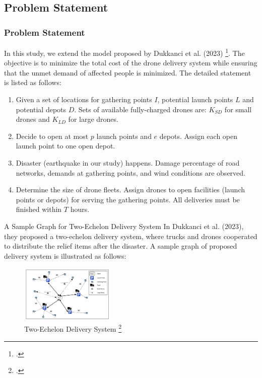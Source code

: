 \documentclass[aspectratio=169]{beamer}
\begin{document}
\subsection{Problem Statement}
\begin{frame}
    \frametitle{Problem Statement}
    In this study, we extend the model proposed by Dukkanci et al. (2023) \footcites{dukkanci2023drones}. The objective is to minimize the total cost of the drone delivery system while ensuring that the unmet demand of affected people is minimized. The detailed statement is listed as follows:
    \begin{enumerate}[label=\arabic*.]
        \item Given a set of locations for gathering points $I$, potential launch points $L$ and potential depots $D$. Sets of available fully-charged drones are: $K_{SD}$ for small drones and $K_{LD}$ for large drones. 
        \item Decide to open at most $p$ launch points and $e$ depots. Assign each open launch point to one open depot.
        \item Disaster (earthquake in our study) happens. Damage percentage of road networks, demands at gathering points, and wind conditions are observed.
        \item Determine the size of drone fleets. Assign drones to open facilities (launch points or depots) for serving the gathering points. All deliveries must be finished within $T$ hours. 
    \end{enumerate}
\end{frame}

\begin{frame}{A Sample Graph for Two-Echelon Delivery System}
    In Dukkanci et al. (2023), they proposed a two-echelon delivery system, where trucks and drones cooperated to distribute the relief items after the disaster. A sample graph of proposed delivery system is illustrated as follows:
    \begin{figure}[h]
        \centering
        \includegraphics[width=0.4\textwidth]{Drone_delivery_system.png}
        \caption{Two-Echelon Delivery System \footcite{dukkanci2023drones}}
        \label{fig:delivery_system}
    \end{figure}
\end{frame}
\end{document}
